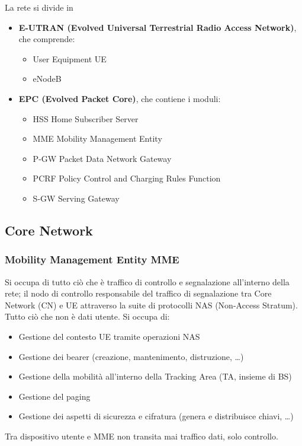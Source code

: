 La rete si divide in 
\begin{itemize}
	\item \textbf{E-UTRAN (Evolved Universal Terrestrial Radio Access Network)}, che comprende: 
	\begin{itemize}
		\item User Equipment UE
		\item eNodeB
	\end{itemize}
	\item \textbf{EPC (Evolved Packet Core)}, che contiene i moduli: 
	\begin{itemize}
		\item HSS Home Subscriber Server
		\item MME Mobility Management Entity
		\item P-GW Packet Data Network Gateway
		\item PCRF Policy Control and Charging Rules Function
		\item S-GW Serving Gateway
	\end{itemize}
\end{itemize}

\subsection{Core Network}

\subsubsection{Mobility Management Entity MME} 

Si occupa di tutto ciò che è traffico di controllo e segnalazione all'interno della rete; il nodo di controllo responsabile del traffico di segnalazione tra Core Network (CN) e UE attraverso la suite di protocolli NAS (Non-Access Stratum). Tutto ciò che non è dati utente. Si occupa di: 
\begin{itemize}
	\item Gestione del contesto UE tramite operazioni NAS
	\item Gestione dei bearer (creazione, mantenimento, distruzione, \dots)
	\item Gestione della mobilità all'interno della Tracking Area (TA, insieme di BS)
	\item Gestione del paging
	\item Gestione dei aspetti di sicurezza e cifratura (genera e distribuisce chiavi, \dots)
\end{itemize}
Tra dispositivo utente e MME non transita mai traffico dati, solo controllo.\\

